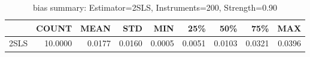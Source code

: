 \begin{table}[ht]
\centering
\caption{bias summary: Estimator=2SLS, Instruments=200, Strength=0.90}
\begin{tabular}{lrrrrrrrr}
\toprule
 & COUNT & MEAN & STD & MIN & 25\% & 50\% & 75\% & MAX \\
\midrule
2SLS & 10.0000 & 0.0177 & 0.0160 & 0.0005 & 0.0051 & 0.0103 & 0.0321 & 0.0396 \\
\bottomrule
\end{tabular}
\end{table}
